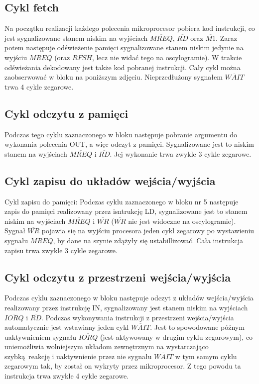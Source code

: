 \documentclass[fleqn]{article}
\newcommand\square[1]{
	\fcolorbox{black}{#1}{\rule{0pt}{6pt}\rule{6pt}{0pt}}
}
\begin{document}


\subsection{Cykl fetch}

Na początku realizacji każdego polecenia mikroprocesor pobiera kod instrukcji, co jest sygnalizowane stanem niskim na wyjściach $\overline{MREQ}$, $\overline{RD}$ oraz $\overline{M1}$. Zaraz potem następuje odświeżenie pamięci sygnalizowane stanem niskim jedynie na wyjściu $\overline{MREQ}$ (oraz $\overline{RFSH}$, lecz nie widać tego na oscylogramie). W trakcie odświeżania dekodowany jest także kod pobranej instrukcji.
Cały cykl można zaobserwować w bloku \square{red} na poniższym zdjęciu. Nieprzedłużony sygnałem $\overline{WAIT}$ trwa 4 cykle zegarowe.

\subsection{Cykl odczytu z pamięci}

Podczas tego cyklu zaznaczonego w bloku \square{cyan} następuje pobranie argumentu do wykonania polecenia OUT, a więc odczyt z pamięci.
Sygnalizowane jest to niskim stanem na wyjściach $\overline{MREQ}$ i $\overline{RD}$. Jej wykonanie trwa zwykle 3 cykle zegarowe.

\subsection{Cykl zapisu do układów wejścia/wyjścia}

Cykl zapisu do pamięci:
Podczas cyklu zaznaczonego w bloku nr 5 następuje zapis do pamięci realizowany przez isntrukcję LD, sygnalizowane jest to stanem niskim na wyjściach $\overline{MREQ}$ i $\overline{WR}$ ($\overline{WR}$ nie jest widoczne na oscylogramie). Sygnał $\overline{WR}$ pojawia się na wyjściu procesora jeden cykl zegarowy po wystawieniu sygnału $\overline{MREQ}$, by dane na szynie zdążyły się ustabillizować. Cała instrukcja zapisu trwa zwykle 3 cykle zegarowe.



\subsection{Cykl odczytu z przestrzeni wejścia/wyjścia}

Podczas cyklu zaznaczonego w bloku \square{violet} następuje odczyt z układów wejścia/wyjścia realizowany przez instrukcję IN, sygnalizowany jest stanem niskim na wyjściach $\overline{IORQ}$ i $\overline{RD}$. Podczas wykonywania instrukcji z przestrzeni wejścia/wyjścia automatycznie jest wstawiany jeden cykl $\overline{WAIT}$. Jest to spowodowane późnym uaktywnieniem sygnału $\overline{IORQ}$ (jest aktywowany w drugim cyklu zegarowym), co uniemożliwia wolniejszym układom zewnętrznym na wystarczająco szybką reakcję i uaktywnienie przez nie sygnału $\overline{WAIT}$ w tym samym cyklu zegarowym tak, by został on wykryty przez mikroprocesor. Z tego powodu ta instrukcja trwa zwykle 4 cykle zegarowe.
\end{document}
